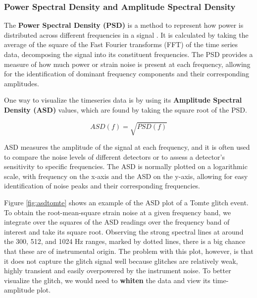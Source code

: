 \documentclass[12pt]{article}
\begin{document}
\medskip
\subsubsection{Power Spectral Density and Amplitude Spectral Density}

\medskip
\noindent The \textbf{Power Spectral Density (PSD)} is a method to represent how power is distributed across different frequencies in a signal \cite{Oppenheim_2009, Li:2013lza}. It is calculated by taking the average of the square of the Fast Fourier transforms (FFT) of the time series data, decomposing the signal into its constituent frequencies. The PSD provides a measure of how much power or strain noise is present at each frequency, allowing for the identification of dominant frequency components and their corresponding amplitudes.

\medskip
\noindent One way to visualize the timeseries data is by using its \textbf{Amplitude Spectral Density (ASD)} values, which are found by taking the square root of the PSD.

\begin{equation}
    ASD(f) = \sqrt{PSD(f)}
    \label{eq:asd}
\end{equation}

\noindent ASD measures the amplitude of the signal at each frequency, and it is often used to compare the noise levels of different detectors or to assess a detector's sensitivity to specific frequencies. The ASD is normally plotted on a logarithmic scale, with frequency on the x-axis and the ASD on the y-axis, allowing for easy identification of noise peaks and their corresponding frequencies.

\medskip
\noindent Figure \ref{fig:asdtomte} shows an example of the ASD plot of a Tomte glitch event. To obtain the root-mean-square strain noise at a given frequency band, we integrate over the squares of the ASD readings over the frequency band of interest and take its square root. Observing the strong spectral lines at around the 300, 512, and 1024 Hz ranges, marked by dotted lines, there is a big chance that these are of instrumental origin. The problem with this plot, however, is that it does not capture the glitch signal well because glitches are relatively weak, highly transient and easily overpowered by the instrument noise. To better visualize the glitch, we would need to \textbf{whiten} the data and view its time-amplitude plot.
\end{document}
